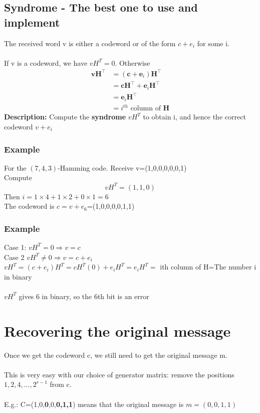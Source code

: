 \documentclass{article}[18pt]
\begin{document}
\subsection{Syndrome - The best one to use and implement}
The received word v is either a codeword or of the form $c+e_i$ for some i.\\
\\
If v is a codeword, we have $vH^T=0$. Otherwise
$$\begin{aligned} \mathbf { v H } ^ { \top } & = \left( \mathbf { c } + \mathbf { e } _ { i } \right) \mathbf { H } ^ { \top } \\ & = \mathbf { c H } ^ { \top } + \mathbf { e } _ { i } \mathbf { H } ^ { \top } \\ & = \mathbf { e } _ { i } \mathbf { H } ^ { \top } \\ & = i ^ { t h } \text { column of } \mathbf { H } \end{aligned}$$
\textbf{Description:} Compute the \textbf{syndrome} $vH^T$ to obtain i, and hence the correct codeword $v+e_i$
\subsubsection{Example}
For the $(7,4,3)$-Hamming code. Receive v=(1,0,0,0,0,0,1)\\
Compute
$$vH^T=(1,1,0)$$
Then $i=1\times 4+ 1\times 2+0\times1=6$\\
The codeword is $c=v+e_6$=(1,0,0,0,0,1,1)
\subsubsection{Example}
Case 1: $vH^T=0\Rightarrow v=c$\\
Case 2 $vH^T\neq 0\Rightarrow v=c+e_i$\\
$vH^T=(c+e_i)H^T=cH^T(0)+e_iH^T=e_iH^T=$ ith column of H=The number i in binary\\
\\
$vH^T$ gives 6 in binary, so the 6th bit is an error
\section{Recovering the original message}
Once we get the codeword c, we still need to get the original message m.\\
\\
This is very easy with our choice of generator matrix: remove the positions $1,2,4,...,2^{r-1}$ from c.\\
\\
E.g.: C=(1,0,\textbf{0},0,\textbf{0,1,1}) means that the original message is $m=(0,0,1,1)$
\end{document}

